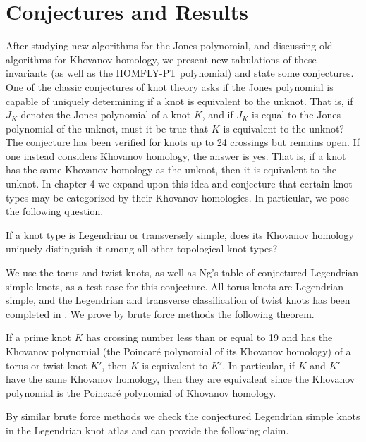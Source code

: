 \section{Conjectures and Results}
    After studying new algorithms for the Jones polynomial, and discussing
    old algorithms for Khovanov homology, we present new tabulations of these
    invariants (as well as the HOMFLY-PT polynomial) and state some conjectures.
    One of the classic conjectures of knot theory asks if the Jones polynomial
    is capable of uniquely determining if a knot is equivalent to the unknot.
    That is, if $J_{K}$ denotes the Jones polynomial of a knot $K$, and if
    $J_{K}$ is equal to the Jones polynomial of the unknot, must it be true
    that $K$ is equivalent to the unknot? The conjecture has been verified for
    knots up to 24 crossings \cite{VerificationUnknotJonesConjUpTo24} but
    remains open. If one instead considers Khovanov homology, the answer is
    yes. That is, if a knot has the same Khovanov homology as the unknot, then
    it is equivalent to the unknot. In chapter 4 we expand upon this idea and
    conjecture that certain knot types may be categorized by their Khovanov
    homologies. In particular, we pose the following question.
    \begin{question}
        If a knot type is Legendrian or transversely simple, does its Khovanov
        homology uniquely distinguish it among all other topological knot types?
    \end{question}
    We use the torus and twist knots, as well as Ng's table of conjectured
    Legendrian simple knots, as a test case for this conjecture. All
    torus knots are Legendrian simple, and the Legendrian and transverse
    classification of twist knots has been completed in
    \cite{EtnyreEtAlLegendrianAndTransverseTwistKnots}. We prove by brute
    force methods the following theorem.
    \begin{theorem}
        If a prime knot $K$ has crossing number less than or equal to 19 and
        has the Khovanov polynomial (the Poincar\'{e} polynomial
        of its Khovanov homology) of a torus or twist knot $K'$, then $K$ is
        equivalent to $K'$. In particular, if $K$ and $K'$ have the same
        Khovanov homology, then they are equivalent since the Khovanov
        polynomial is the Poincar\'{e} polynomial of Khovanov homology.
    \end{theorem}
    By similar brute force methods we check the conjectured Legendrian simple
    knots in the Legendrian knot atlas and can provide the following claim.
